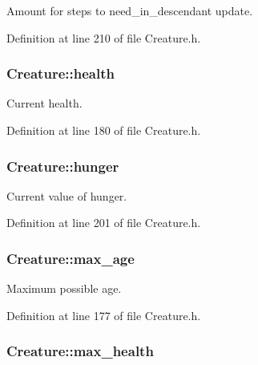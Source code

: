 Amount for steps to need\-\_\-in\-\_\-descendant update. 



Definition at line 210 of file Creature.\-h.

\hypertarget{classCreature_ab59bc1917022e01b46b23f947bb8d688}{
\subsubsection[{health}]{ Creature\-::health\hspace{0.3cm}{\ttfamily [protected]}}}\label{classCreature_ab59bc1917022e01b46b23f947bb8d688}


Current health. 



Definition at line 180 of file Creature.\-h.

\hypertarget{classCreature_a0ac52285317bd2d52b3901b9c2a9c24a}{
\subsubsection[{hunger}]{ Creature\-::hunger\hspace{0.3cm}{\ttfamily [protected]}}}\label{classCreature_a0ac52285317bd2d52b3901b9c2a9c24a}


Current value of hunger. 



Definition at line 201 of file Creature.\-h.

\hypertarget{classCreature_a57d8397db4c0e505deff7c1d7cead3e1}{
\subsubsection[{max\-\_\-age}]{ Creature\-::max\-\_\-age\hspace{0.3cm}{\ttfamily [protected]}}}\label{classCreature_a57d8397db4c0e505deff7c1d7cead3e1}


Maximum possible age. 



Definition at line 177 of file Creature.\-h.

\hypertarget{classCreature_a0628a001b2c326388b08ea664e0c4e8f}{
\subsubsection[{max\-\_\-health}]{ Creature\-::max\-\_\-health\hspace{0.3cm}{\ttfamily [protected]}}}\label{classCreature_a0628a001b2c326388b08ea664e0c4e8f}


